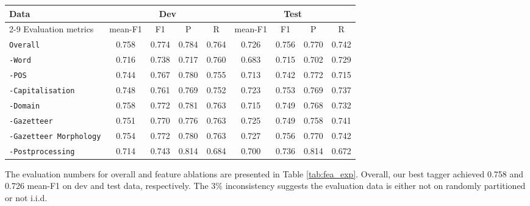 \documentclass[11pt]{article}
\newcommand{\method}[1]{\textsf{#1}\xspace}
\newcommand{\feature}[1]{\texttt{#1}\xspace}
\newcommand{\tabref}[2][]{Table#1 \ref{#2}}
\begin{document}
\begin{table*}[!htbp]
\begin{center}
\begin{tabular}{lcccccccc}
\toprule
Data                                         & \multicolumn{4}{c}{Dev}             & \multicolumn{4}{c}{Test}        \\
\cmidrule{2-9}
Evaluation metrics                           & mean-F1 & F1    & P     & R         & mean-F1 & F1    & P     & R     \\ 
\midrule
\feature{Overall}                            & 0.758   & 0.774 & 0.784 & 0.764     & 0.726   & 0.756 & 0.770 & 0.742 \\
\feature{-Word}                              & 0.716   & 0.738 & 0.717 & 0.760     & 0.683   & 0.715 & 0.702 & 0.729 \\
\feature{-POS}                               & 0.744   & 0.767 & 0.780 & 0.755     & 0.713   & 0.742 & 0.772 & 0.715 \\
\feature{-Capitalisation}                    & 0.748   & 0.761 & 0.769 & 0.752     & 0.723   & 0.753 & 0.769 & 0.737 \\
\feature{-Domain}                            & 0.758   & 0.772 & 0.781 & 0.763     & 0.715   & 0.749 & 0.768 & 0.732 \\
\feature{-Gazetteer}                         & 0.751   & 0.770 & 0.776 & 0.763     & 0.725   & 0.749 & 0.758 & 0.741 \\
\feature{-Gazetteer Morphology}              & 0.754   & 0.772 & 0.780 & 0.763     & 0.727   & 0.756 & 0.770 & 0.742 \\
\feature{-Postprocessing}                    & 0.714   & 0.743 & 0.814 & 0.684     & 0.700   & 0.736 & 0.814 & 0.672 \\
\bottomrule
\end{tabular}
\end{center}
\caption{Overall experiment results and feature ablations}
\label{tab:fea_exp}
\end{table*}

The evaluation numbers for overall and feature ablations are presented in \tabref{tab:fea_exp}.
Overall, our best tagger achieved 0.758 and 0.726 mean-F1 on dev and test data, respectively.
The 3\% inconsistency suggests the evaluation data is either not on randomly partitioned or not \method{i.i.d}.
\end{document}
